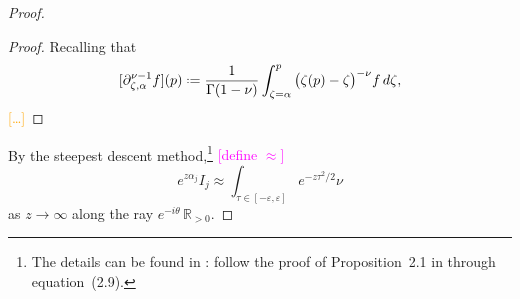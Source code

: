 \documentclass{article}
\let\Re\relax
\DeclareMathOperator{\Re}{Re}
\newcommand{\R}{\mathbb{R}}
\newcommand*{\defeq}{\mathrel{\vcenter{\baselineskip0.5ex \lineskiplimit0pt
                     \hbox{\scriptsize.}\hbox{\scriptsize.}}}%
                     =}
\theoremstyle{definition}
\theoremstyle{plain}
\begin{document}
\begin{proof}
\begin{proof}
Recalling that
\[ [\partial^{\nu-1}_{\zeta, \alpha} f](p) \defeq \frac{1}{\Gamma(1-\nu)} \int_{\zeta = \alpha}^p \big(\zeta(p)-\zeta\big)^{-\nu} f\,d\zeta, \]
\textcolor{orange}{[\ldots]}
\end{proof}

By the steepest descent method,\footnote{The details can be found in \cite{miller2006applied}: follow the proof of Proposition~2.1 in through equation~(2.9).} \textcolor{magenta}{[define $\approx$]}
\[ e^{z \alpha_j} I_j \approx \int_{\tau \in [-\varepsilon, \varepsilon]} e^{-z\tau^2/2} \nu \]
as $z \to \infty$ along the ray $e^{-i\theta}\, \R_{> 0}$.
\color{black}
\end{proof}
\end{document}
